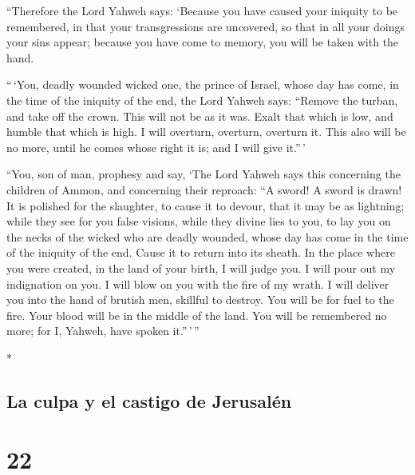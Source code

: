 \begin{paracol}{2}
\begin{otherlanguage}{english}
 ``Therefore the Lord Yahweh says: `Because you have
caused your iniquity to be remembered, in that your transgressions are
uncovered, so that in all your doings your sins appear; because you have
come to memory, you will be taken with the hand.

 ``\,`You, deadly wounded wicked one, the prince of
Israel, whose day has come, in the time of the iniquity of the end,
 the Lord Yahweh says: ``Remove the turban, and take off
the crown. This will not be as it was. Exalt that which is low, and
humble that which is high.  I will overturn, overturn,
overturn it. This also will be no more, until he comes whose right it
is; and I will give it.''\,'

 ``You, son of man, prophesy and say, `The Lord Yahweh
says this concerning the children of Ammon, and concerning their
reproach: ``A sword! A sword is drawn! It is polished for the slaughter,
to cause it to devour, that it may be as lightning; 
while they see for you false visions, while they divine lies to you, to
lay you on the necks of the wicked who are deadly wounded, whose day has
come in the time of the iniquity of the end.  Cause it to
return into its sheath. In the place where you were created, in the land
of your birth, I will judge you.  I will pour out my
indignation on you. I will blow on you with the fire of my wrath. I will
deliver you into the hand of brutish men, skillful to destroy.
 You will be for fuel to the fire. Your blood will be in
the middle of the land. You will be remembered no more; for I, Yahweh,
have spoken it.''\,'\,''

\end{otherlanguage}

\switchcolumn[0]*

\hypertarget{la-culpa-y-el-castigo-de-jerusaluxe9n}{%
\subsection{La culpa y el castigo de
Jerusalén}\label{la-culpa-y-el-castigo-de-jerusaluxe9n}}

\hypertarget{section-42}{%
\section{22}\label{section-42}}


\end{paracol}
